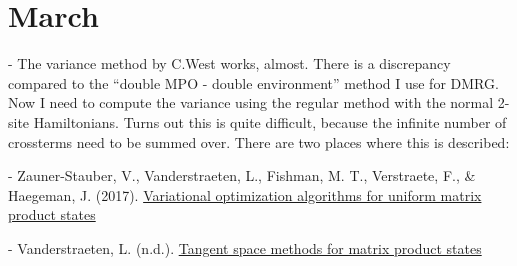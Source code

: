 \documentclass[a4paper]{article}
\begin{document}
\section*{March}
\begin{markdown}
- The variance method by C.West works, almost. There is a discrepancy compared to the ``double MPO - double environment'' method I use for DMRG. Now I need to compute the variance using the regular method with the normal 2-site Hamiltonians. Turns out this is quite difficult, because the infinite number of crossterms need to be summed over. There are two places where this is described:

	- Zauner-Stauber, V., Vanderstraeten, L., Fishman, M. T., Verstraete, F., \& Haegeman, J. (2017). \href{https://doi.org/10.1103/PhysRevB.97.045145}{Variational optimization algorithms for uniform matrix product states} 
	
	- Vanderstraeten, L. (n.d.). \href{http://quantumtensor.pks.mpg.de/wp-content/uploads/2016/06/notes_2.pdf}{Tangent space methods for matrix product states}




\end{markdown}
\end{document}
